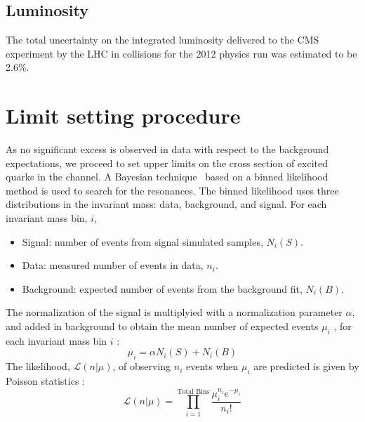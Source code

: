 \subsection{Luminosity}
The total uncertainty on the integrated luminosity\cite{CMS-PAS-LUM-13-001} delivered to the CMS experiment by the LHC in \pp collisions
for the 2012 physics run was estimated to be 2.6\%.

\section{ Limit setting procedure }
As no significant excess is observed in data with respect to the background expectations, we proceed to set upper limits on the cross section 
of excited quarks in the \gamjet channel. A Bayesian technique~\cite{Beringer:1900zz} based on a binned likelihood method is used to search for 
the \qstar resonances. The binned likelihood uses three distributions in the \gamjet invariant mass: data, background, and signal. For each 
\gamjet invariant mass bin, $i$,
\begin{itemize}
\item Signal: number of events from \qstar signal simulated samples, $N_i(S)$.
\item Data: measured number of events in data, $n_i$.
\item Background: expected number of events from the background fit, $N_i(B)$.
\end{itemize}

The normalization of the \qstar signal is multiplyied with a normalization parameter $\alpha$, and added in background to obtain
the mean number of expected events $\mu_i$ , for each \gamjet invariant mass bin $i$ :
\begin{equation}
\mu_{i} = \alpha N_{i}(S) + N_{i}(B)
\end{equation}
The likelihood, $\mathcal{L}(n|\mu)$, of observing $n_i$ events when $\mu_i$ are predicted is given by Poisson statistics :
\begin{equation}
\mathcal{L}(n|\mu) = \prod_{i=1}^{\text{Total Bins}}\frac{\mu^{n_{i}}_{i}e^{-\mu_{i}}}{n_{i}!}
\end{equation}

